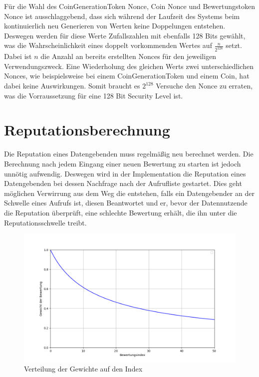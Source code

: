 \documentclass[
	fontsize=12pt,
	headings=small,
	parskip=half,           %
	bibliography=totoc,
	numbers=noenddot,       %
	open=any,               %
]{scrreprt}
\begin{document}
Für die Wahl des CoinGenerationToken Nonce, Coin Nonce und Bewertungstoken Nonce ist ausschlaggebend, dass sich während der Laufzeit des Systems beim kontinuierlich neu Generieren von Werten keine Doppelungen entstehen. Deswegen werden für diese Werte Zufallszahlen mit ebenfalls 128 Bits gewählt, was die Wahrscheinlichkeit eines doppelt vorkommenden Wertes auf $\frac{n}{2^{128}}$ setzt. Dabei ist $n$ die Anzahl an bereits erstellten Nonces für den jeweiligen Verwendungszweck. Eine Wiederholung des gleichen Werts zwei unterschiedlichen Nonces, wie beispielsweise bei einem CoinGenerationToken und einem Coin, hat dabei keine Auswirkungen. Somit braucht es $2^{128}$ Versuche den Nonce zu erraten, was die Vorraussetzung für eine 128 Bit Security Level ist.

\section{Reputationsberechnung}
Die Reputation eines Datengebenden muss regelmäßig neu berechnet werden. Die Berechnung nach jedem Eingang einer neuen Bewertung zu starten ist jedoch unnötig aufwendig. Deswegen wird in der Implementation die Reputation eines Datengebenden bei dessen Nachfrage nach der Aufrufliste gestartet. Dies geht möglichen Verwirrung aus dem Weg die entstehen, falls ein Datengebender an der Schwelle eines Aufrufs ist, diesen Beantwortet und er, bevor der Datennutzende die Reputation überprüft, eine schlechte Bewertung erhält, die ihn unter die Reputationsschwelle treibt.

\begin{figure}[h]
    \centering
    \caption{Verteilung der Gewichte auf den Index}
    \label{fig:reputationWeights}
    \includegraphics[width=0.8\linewidth]{ReputationWeights.png}
\end{figure}
\end{document}
